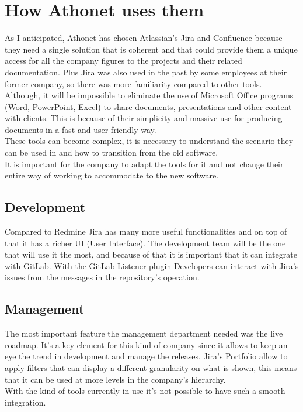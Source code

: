 \section{How Athonet uses them}
	As I anticipated, Athonet has chosen Atlassian's Jira and Confluence because they need a single solution that is coherent and that could provide them a unique access for all the company figures to the projects and their related documentation.
	Plus Jira was also used in the past by some employees at their former company, so there was more familiarity compared to other tools.\\
	Although, it will be impossible to eliminate the use of Microsoft Office programs (Word, PowerPoint, Excel) to share documents, presentations and other content with clients.
	This is because of their simplicity and massive use for producing documents in a fast and user friendly way.\\
	These tools can become complex, it is necessary to understand the scenario they can be used in and how to transition from the old software.\\
	It is important for the company to adapt the tools for it and not change their entire way of working to accommodate to the new software.
	\subsection{Development} 
		Compared to Redmine Jira has many more useful functionalities and on top of that it has a richer UI (User Interface).
		The development team will be the one that will use it the most, and because of that it is important that it can integrate with GitLab.
		With the GitLab Listener plugin\cite{gitlab-listener} Developers can interact with Jira's issues from the messages in the repository's operation.
	
	\subsection{Management} 
		The most important feature the management department needed was the live roadmap.	
		It's a key element for this kind of company since it allows to keep an eye the trend in development and manage the releases.
		Jira's Portfolio allow to apply filters that can display a different granularity on what is shown, this means that it can be used at more levels in the company's hierarchy.\\
		With the kind of tools currently in use it's not possible to have such a smooth integration.
	
